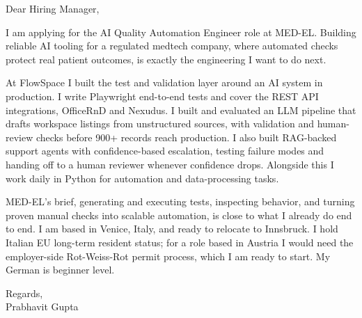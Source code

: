 \documentclass[a4paper,11pt]{article}
\begin{document}
Dear Hiring Manager,

I am applying for the AI Quality Automation Engineer role at MED-EL. Building reliable AI tooling for a regulated medtech company, where automated checks protect real patient outcomes, is exactly the engineering I want to do next.

At FlowSpace I built the test and validation layer around an AI system in production. I write Playwright end-to-end tests and cover the REST API integrations, OfficeRnD and Nexudus. I built and evaluated an LLM pipeline that drafts workspace listings from unstructured sources, with validation and human-review checks before 900+ records reach production. I also built RAG-backed support agents with confidence-based escalation, testing failure modes and handing off to a human reviewer whenever confidence drops. Alongside this I work daily in Python for automation and data-processing tasks.

MED-EL's brief, generating and executing tests, inspecting behavior, and turning proven manual checks into scalable automation, is close to what I already do end to end. I am based in Venice, Italy, and ready to relocate to Innsbruck. I hold Italian EU long-term resident status; for a role based in Austria I would need the employer-side Rot-Weiss-Rot permit process, which I am ready to start. My German is beginner level.

Regards,\\
Prabhavit Gupta
\end{document}
